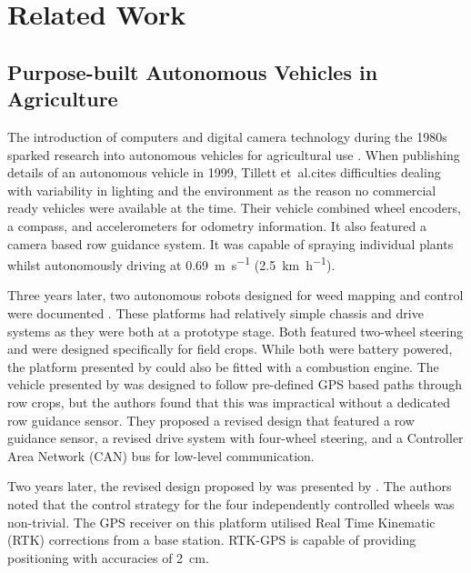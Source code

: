 \documentclass[preprint,authoryear,12pt]{elsarticle}
\begin{document}
\section{Related Work}
\label{sect:review}

    \subsection{Purpose-built Autonomous Vehicles in Agriculture}

        The introduction of computers and digital camera technology during the 1980s sparked research into autonomous vehicles for agricultural use \citep{Li2009}.
        When publishing details of an autonomous vehicle in 1999, Tillett et~al.\@ cites difficulties dealing with variability in lighting and the environment as the reason no commercial ready vehicles were available at the time.
        Their vehicle combined wheel encoders, a compass, and accelerometers for odometry information.
        It also featured a camera based row guidance system.
        It was capable of spraying individual plants whilst autonomously driving at \SI{0.69}{\meter\per\second} (\SI{2.5}{\kilo\meter\per\hour}).

        Three years later, two autonomous robots designed for weed mapping and control were documented \citep{Pedersen2002,Astrand2002}.
        These platforms had relatively simple chassis and drive systems as they were both at a prototype stage.
        Both featured two-wheel steering and were designed specifically for field crops.
        While both were battery powered, the platform presented by \cite{Astrand2002} could also be fitted with a combustion engine.
        The vehicle presented by \cite{Pedersen2002} was designed to follow pre-defined GPS based paths through row crops, but the authors found that this was impractical without a dedicated row guidance sensor.
        They proposed a revised design that featured a row guidance sensor, a revised drive system with four-wheel steering, and a Controller Area Network (CAN) bus for low-level communication.

        Two years later, the revised design proposed by \cite{Pedersen2002} was presented by \cite{Bak2004}.
        The authors noted that the control strategy for the four independently controlled wheels was non-trivial.
        The GPS receiver on this platform utilised Real Time Kinematic (RTK) corrections from a base station.
        RTK-GPS is capable of providing positioning with accuracies of \SI{2}{\centi\meter}.
\end{document}
